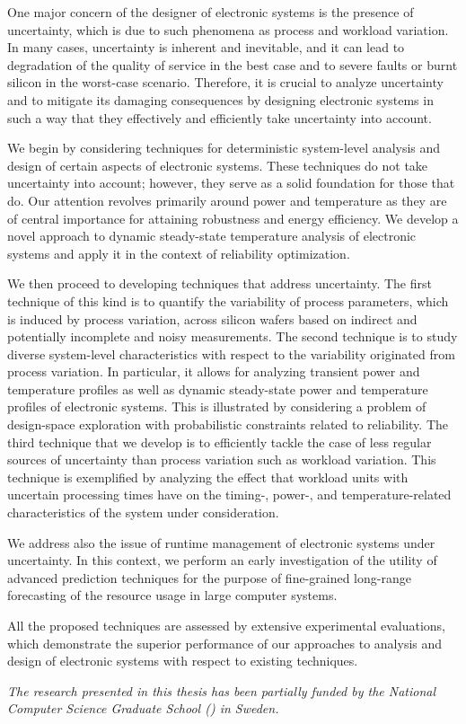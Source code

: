 One major concern of the designer of electronic systems is the presence of
uncertainty, which is due to such phenomena as process and workload variation.
In many cases, uncertainty is inherent and inevitable, and it can lead to
degradation of the quality of service in the best case and to severe faults or
burnt silicon in the worst-case scenario. Therefore, it is crucial to analyze
uncertainty and to mitigate its damaging consequences by designing electronic
systems in such a way that they effectively and efficiently take uncertainty
into account.

We begin by considering techniques for deterministic system-level analysis and
design of certain aspects of electronic systems. These techniques do not take
uncertainty into account; however, they serve as a solid foundation for those
that do. Our attention revolves primarily around power and temperature as they
are of central importance for attaining robustness and energy efficiency. We
develop a novel approach to dynamic steady-state temperature analysis of
electronic systems and apply it in the context of reliability optimization.

We then proceed to developing techniques that address uncertainty. The first
technique of this kind is to quantify the variability of process parameters,
which is induced by process variation, across silicon wafers based on indirect
and potentially incomplete and noisy measurements. The second technique is to
study diverse system-level characteristics with respect to the variability
originated from process variation. In particular, it allows for analyzing
transient power and temperature profiles as well as dynamic steady-state power
and temperature profiles of electronic systems. This is illustrated by
considering a problem of design-space exploration with probabilistic constraints
related to reliability. The third technique that we develop is to efficiently
tackle the case of less regular sources of uncertainty than process variation
such as workload variation. This technique is exemplified by analyzing the
effect that workload units with uncertain processing times have on the timing-,
power-, and temperature-related characteristics of the system under
consideration.

We address also the issue of runtime management of electronic systems under
uncertainty. In this context, we perform an early investigation of the utility
of advanced prediction techniques for the purpose of fine-grained long-range
forecasting of the resource usage in large computer systems.

All the proposed techniques are assessed by extensive experimental evaluations,
which demonstrate the superior performance of our approaches to analysis and
design of electronic systems with respect to existing techniques.

\vspace{1em}
\noindent
\emph{
  The research presented in this thesis has been partially funded by the
  National Computer Science Graduate School () in Sweden.
}
